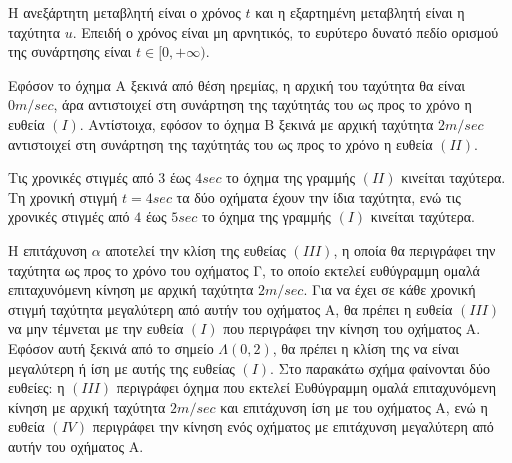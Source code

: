 
\begin{alist}
\item Η ανεξάρτητη μεταβλητή είναι ο χρόνος $t$ και η εξαρτημένη μεταβλητή είναι η ταχύτητα $u$.
Επειδή ο χρόνος είναι μη αρνητικός, το ευρύτερο δυνατό πεδίο ορισμού της συνάρτησης είναι $t \in [0, +\infty)$.

\item
\begin{rlist}
\item Εφόσον το όχημα Α ξεκινά από θέση ηρεμίας, η αρχική του ταχύτητα θα είναι $0 m/sec$, άρα αντιστοιχεί στη συνάρτηση της ταχύτητάς του ως προς το χρόνο η ευθεία $(I)$.
Αντίστοιχα, εφόσον το όχημα Β ξεκινά με αρχική ταχύτητα $2 m/sec$ αντιστοιχεί στη συνάρτηση της ταχύτητάς του ως προς το χρόνο η ευθεία $(I\!I)$.
\item Τις χρονικές στιγμές από $3$ έως $4 sec$ το όχημα της γραμμής $(I\!I)$ κινείται ταχύτερα. Τη χρονική στιγμή $t = 4 sec$ τα δύο οχήματα έχουν την ίδια ταχύτητα, ενώ τις χρονικές στιγμές από $4$ έως $5 sec$ το όχημα της γραμμής $(I)$ κινείται ταχύτερα.
\item Η επιτάχυνση $\alpha$ αποτελεί την κλίση της ευθείας $(I\!I\!I)$, η οποία θα περιγράφει την ταχύτητα ως προς το χρόνο του οχήματος Γ, το οποίο εκτελεί ευθύγραμμη ομαλά επιταχυνόμενη κίνηση με αρχική ταχύτητα $2m/sec$. Για να έχει σε κάθε χρονική στιγμή ταχύτητα μεγαλύτερη από αυτήν του οχήματος Α, θα πρέπει η ευθεία $(I\!I\!I)$ να μην τέμνεται με την ευθεία $(I)$ που περιγράφει την κίνηση του οχήματος Α. Εφόσον αυτή ξεκινά από το σημείο $\Lambda(0,2)$, θα πρέπει η κλίση της να είναι μεγαλύτερη ή ίση με αυτής της ευθείας $(I)$. Στο παρακάτω σχήμα φαίνονται δύο ευθείες: η $(I\!I\!I)$ περιγράφει όχημα που εκτελεί Ευθύγραμμη ομαλά επιταχυνόμενη κίνηση με αρχική ταχύτητα $2 m/sec$ και επιτάχυνση ίση με του οχήματος Α, ενώ η ευθεία $(IV)$ περιγράφει την κίνηση ενός οχήματος με επιτάχυνση μεγαλύτερη από αυτήν του οχήματος Α.
\begin{center}
\end{center}
\end{rlist}
\end{alist}
